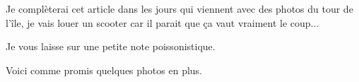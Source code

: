 \begin{multicols}{2}
Je complèterai cet article dans les jours qui viennent avec des photos du tour de l'île, je vais louer un scooter car il parait que ça vaut vraiment le coup...

Je vous laisse sur une petite note poissonistique.


Voici comme promis quelques photos en plus.




\end{multicols}


